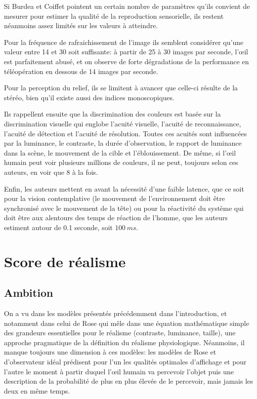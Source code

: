 	\par Si Burdea et Coiffet pointent un certain nombre de paramètres qu'ils convient de mesurer pour estimer la qualité de la reproduction sensorielle, ils restent néanmoins assez limités sur les valeurs à atteindre.
	
	\par Pour la fréquence de rafraichissement de l'image ils semblent considérer qu'une valeur entre 14 et 30 soit suffisante: à partir de 25 à 30 images par seconde, l'œil est parfaitement abusé, et on observe de forte dégradations de la performance en téléopération en dessous de 14 images par seconde.
	
	\par Pour la perception du relief, ils se limitent à avancer que celle-ci résulte de la stéréo, bien qu'il existe aussi des indices monoscopiques.
	
	\par Ils rappellent ensuite que la discrimination des couleurs est basée sur la discrimination visuelle qui englobe l'acuité visuelle, l'acuité de reconnaissance, l'acuité de détection et l'acuité de résolution. Toutes ces acuités sont influencées par la luminance, le contraste, la durée d'observation, le rapport de luminance dans la scène, le mouvement de la cible et l'éblouissement. De même, si l'œil humain peut voir plusieurs millions de couleurs, il ne peut, toujours selon ces auteurs, en voir que 8 à la fois.
	
	\par Enfin, les auteurs mettent en avant la nécessité d'une faible latence, que ce soit pour la vision contemplative (le mouvement de l'environnement doit être synchronisé avec le mouvement de la tête) ou pour la réactivité du système qui doit être aux alentours des temps de réaction de l'homme, que les auteurs estiment autour de 0.1 seconde, soit $100~ms$.
	
	\chapter{Score de réalisme}
	\section{Ambition}	
	\par On a vu dans les modèles présentés précédemment dans l'introduction, et notamment dans celui de Rose qui mêle dans une équation mathématique simple des grandeurs essentielles pour le réalisme (contraste, luminance, taille), une approche pragmatique de la définition du réalisme physiologique. Néanmoins, il manque toujours une dimension à ces modèles: les modèles de Rose et d'observateur idéal prédisent pour l'un les qualités optimales d'affichage et pour l'autre le moment à partir duquel l'œil humain va percevoir l'objet puis une description de la probabilité de plus en plus élevée de le percevoir, mais jamais les deux en même temps.
	
